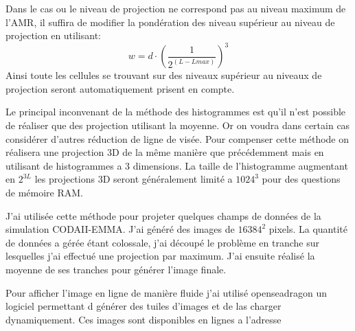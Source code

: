 Dans le cas ou le niveau de projection ne correspond pas au niveau maximum de l'AMR, il suffira de modifier la pondération des niveau supérieur au niveau de projection en utilisant:
\begin{equation}
w = d \cdot \left( \frac{1}{2^{(L-Lmax)} }\right)^3
\end{equation}
Ainsi toute les cellules se trouvant sur des niveaux supérieur au niveaux de projection seront automatiquement prisent en compte.

Le principal inconvenant de la méthode des histogrammes est qu'il n'est possible de réaliser que des projection utilisant la moyenne.
Or on voudra dans certain cas considérer d'autres réduction de ligne de visée.
Pour compenser cette méthode on réalisera une projection 3D de la même manière que précédemment mais en utilisant de histogrammes a 3 dimensions.
La taille de l'histogramme augmentant en $2^{3L}$ les projections 3D seront généralement limité a $1024^3$ pour des questions de mémoire RAM. 


J'ai utilisée cette méthode pour projeter quelques champs de données de la simulation CODAII-EMMA.
J'ai généré des images de $16384^2$ pixels.
La quantité de données a gérée étant colossale, j'ai découpé le problème en tranche sur lesquelles j'ai effectué une projection par maximum.
J'ai ensuite réalisé la moyenne de ses tranches pour générer l'image finale.

Pour afficher l'image en ligne de manière fluide j'ai utilisé openseadragon %
un logiciel permettant d générer des tuiles d'images et de las charger dynamiquement.
Ces images sont disponibles en lignes a l'adresse %


